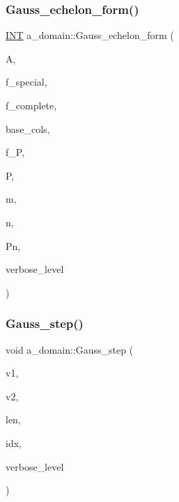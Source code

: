 \subsubsection{\texorpdfstring{Gauss\+\_\+echelon\+\_\+form()}{Gauss\_echelon\_form()}}
{\footnotesize\ttfamily \mbox{\hyperlink{galois_8h_a09fddde158a3a20bd2dcadb609de11dc}{I\+NT}} a\+\_\+domain\+::\+Gauss\+\_\+echelon\+\_\+form (\begin{DoxyParamCaption}\item[{\mbox{\hyperlink{galois_8h_a09fddde158a3a20bd2dcadb609de11dc}{I\+NT}} $\ast$}]{A,  }\item[{\mbox{\hyperlink{galois_8h_a09fddde158a3a20bd2dcadb609de11dc}{I\+NT}}}]{f\+\_\+special,  }\item[{\mbox{\hyperlink{galois_8h_a09fddde158a3a20bd2dcadb609de11dc}{I\+NT}}}]{f\+\_\+complete,  }\item[{\mbox{\hyperlink{galois_8h_a09fddde158a3a20bd2dcadb609de11dc}{I\+NT}} $\ast$}]{base\+\_\+cols,  }\item[{\mbox{\hyperlink{galois_8h_a09fddde158a3a20bd2dcadb609de11dc}{I\+NT}}}]{f\+\_\+P,  }\item[{\mbox{\hyperlink{galois_8h_a09fddde158a3a20bd2dcadb609de11dc}{I\+NT}} $\ast$}]{P,  }\item[{\mbox{\hyperlink{galois_8h_a09fddde158a3a20bd2dcadb609de11dc}{I\+NT}}}]{m,  }\item[{\mbox{\hyperlink{galois_8h_a09fddde158a3a20bd2dcadb609de11dc}{I\+NT}}}]{n,  }\item[{\mbox{\hyperlink{galois_8h_a09fddde158a3a20bd2dcadb609de11dc}{I\+NT}}}]{Pn,  }\item[{\mbox{\hyperlink{galois_8h_a09fddde158a3a20bd2dcadb609de11dc}{I\+NT}}}]{verbose\+\_\+level }\end{DoxyParamCaption})}

\mbox{\label{classa__domain_af3b9321ab12d926c21a8fc4cb7d7d203}} 
\subsubsection{\texorpdfstring{Gauss\+\_\+step()}{Gauss\_step()}}
{\footnotesize\ttfamily void a\+\_\+domain\+::\+Gauss\+\_\+step (\begin{DoxyParamCaption}\item[{\mbox{\hyperlink{galois_8h_a09fddde158a3a20bd2dcadb609de11dc}{I\+NT}} $\ast$}]{v1,  }\item[{\mbox{\hyperlink{galois_8h_a09fddde158a3a20bd2dcadb609de11dc}{I\+NT}} $\ast$}]{v2,  }\item[{\mbox{\hyperlink{galois_8h_a09fddde158a3a20bd2dcadb609de11dc}{I\+NT}}}]{len,  }\item[{\mbox{\hyperlink{galois_8h_a09fddde158a3a20bd2dcadb609de11dc}{I\+NT}}}]{idx,  }\item[{\mbox{\hyperlink{galois_8h_a09fddde158a3a20bd2dcadb609de11dc}{I\+NT}}}]{verbose\+\_\+level }\end{DoxyParamCaption})}

